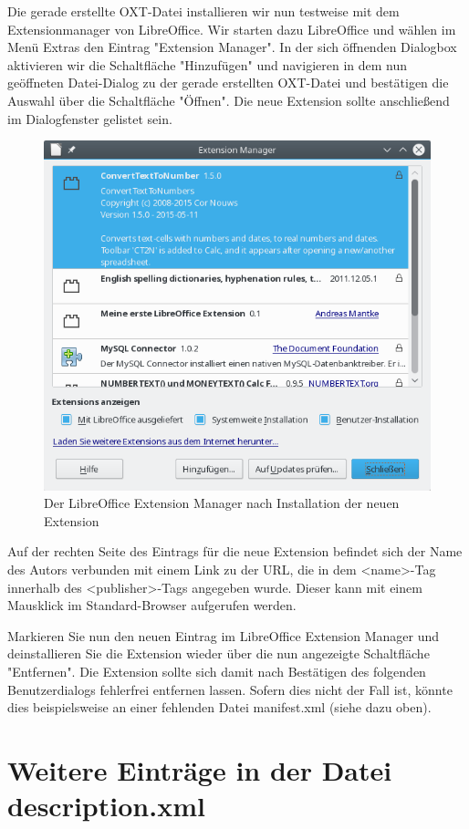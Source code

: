 \documentclass[a4paper,10pt,pagesize,titlepage]{scrbook}
\begin{document}
Die gerade erstellte OXT-Datei installieren wir nun testweise mit dem Extensionmanager von LibreOffice. Wir starten dazu LibreOffice und wählen im Menü Extras den Eintrag "Extension Manager". In der sich öffnenden Dialogbox aktivieren wir die Schaltfläche "Hinzufügen" und navigieren in dem nun geöffneten Datei-Dialog zu der gerade erstellten OXT-Datei und bestätigen die Auswahl über die Schaltfläche "Öffnen". Die neue Extension sollte anschließend im Dialogfenster gelistet sein.
\begin{figure}
\centering
\includegraphics[width=0.7\linewidth]{pics/extensionmanager_extension_load01}
\caption[Extension Manager mit installierter Extension]{Der LibreOffice Extension Manager nach Installation der neuen Extension}
\label{fig:extensionmanager_extension_load01}
\end{figure}

Auf der rechten Seite des Eintrags für die neue Extension befindet sich der Name des Autors verbunden mit einem Link zu der URL, die in dem <name>-Tag innerhalb des <publisher>-Tags angegeben wurde. Dieser kann mit einem Mausklick im Standard-Browser aufgerufen werden.

Markieren Sie nun den neuen Eintrag im LibreOffice Extension Manager und deinstallieren Sie die Extension wieder über die nun angezeigte Schaltfläche "Entfernen". Die Extension sollte sich damit nach Bestätigen des folgenden Benutzerdialogs fehlerfrei entfernen lassen. Sofern dies nicht der Fall ist, könnte dies beispielsweise an einer fehlenden Datei manifest.xml (siehe dazu oben).

\section{Weitere Einträge in der Datei description.xml}
\end{document}
